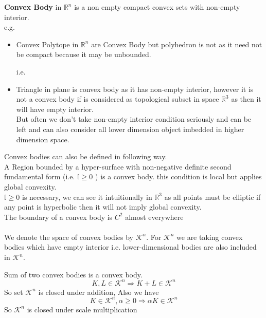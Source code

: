 \documentclass[oneside]{book}
\theoremstyle{definition}
\begin{document}
\textbf{Convex Body } in  $\mathbb{R}^n$  is a non empty compact convex sets with non-empty interior.\\
e.g.\\
\begin{itemize}
    \item   Convex Polytope in $\mathbb{R}^n$ are Convex Body but polyhedron is not as it need not be compact because it may be unbounded. 
    
    i.e.\\
    
    \item 
Triangle in plane is convex body as it has non-empty interior, however it is not a convex body if is considered as topological subset in space  $\mathbb{R}^3$ as then it will have  empty interior. 
\\  
But often we don't take non-empty interior condition seriously and can be left and can also consider all lower dimension object imbedded in higher dimension space.


\end{itemize}

 
Convex bodies can also be defined in following way.\\
     A Region  bounded by a hyper-surface with non-negative definite second fundamental form (i.e. $\mathbb{I} \geq 0 $ ) is a convex body. this condition is local but  applies global convexity. \\
     $\mathbb{I} \geq 0 $ is necessary, we can see it intuitionally in  $\mathbb{R}^3$ as all points must be elliptic if any point is hyperbolic then it will not imply global convexity. \\
     The boundary of a convex body is $C^{2}$ almost everywhere   \\\\
     
     
 
 
 
 
 
 
 
 
 We denote  the space of convex bodies by  $\mathcal{K}^{n}$. For  $\mathcal{K}^{n}$  we are taking convex bodies which have empty interior i.e. lower-dimensional bodies are also included in $\mathcal{K}^{n}$. 

 Sum of two convex bodies is a convex body. \\
 $$
   K, L \in \mathcal{K}^{n} \Longrightarrow K+L \in \mathcal{K}^{n}
$$ 
 So  set $\mathcal{K}^{n}$ is closed under addition,
 Also we have
 $$ 
K \in \mathcal{K}^{n}, \alpha \geq 0 \Longrightarrow \alpha K \in \mathcal{K}^{n}
$$
So  $\mathcal{K}^{n}$ is closed under scale multiplication \\
\end{document}

